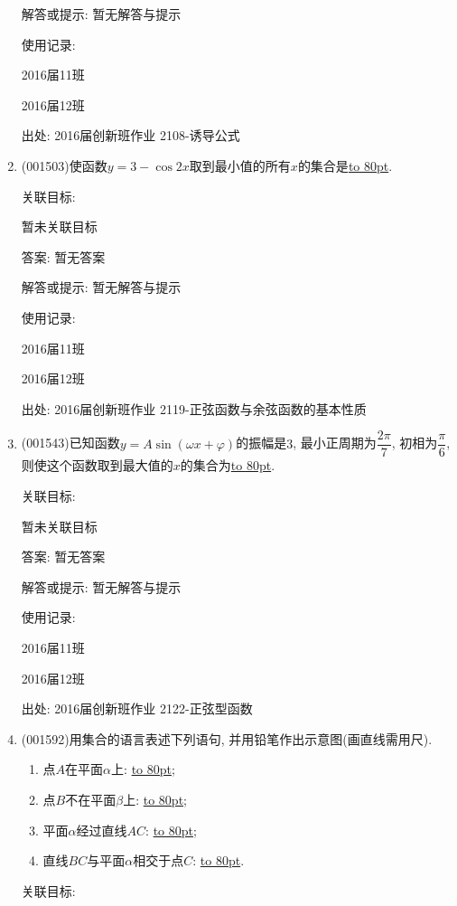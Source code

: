 \documentclass[10pt,a4paper]{article}
\newcommand{\blank}[1]{\underline{\hbox to #1pt{}}}
\begin{document}
\begin{enumerate}[1.]
解答或提示: 暂无解答与提示

使用记录:

2016届11班	

2016届12班	


出处: 2016届创新班作业	2108-诱导公式
\item { (001503)}使函数$y=3-\cos 2x$取到最小值的所有$x$的集合是\blank{80}.


关联目标:

暂未关联目标

答案: 暂无答案

解答或提示: 暂无解答与提示

使用记录:

2016届11班	

2016届12班	


出处: 2016届创新班作业	2119-正弦函数与余弦函数的基本性质
\item { (001543)}已知函数$y=A\sin(\omega x+\varphi)$的振幅是$3$, 最小正周期为$\dfrac{2\pi}{7}$,
初相为$\dfrac{\pi}{6}$, 则使这个函数取到最大值的$x$的集合为\blank{80}.


关联目标:

暂未关联目标

答案: 暂无答案

解答或提示: 暂无解答与提示

使用记录:

2016届11班	

2016届12班	


出处: 2016届创新班作业	2122-正弦型函数
\item { (001592)}用集合的语言表述下列语句, 并用铅笔作出示意图(画直线需用尺).
\begin{enumerate}[(1)]
\item 点$A$在平面$\alpha$上: \blank{80};\\ 
\item 点$B$不在平面$\beta$上: \blank{80};\\ 
\item 平面$\alpha$经过直线$AC$: \blank{80};\\ 
\item 直线$BC$与平面$\alpha$相交于点$C$: \blank{80}.\\ 
\end{enumerate}


关联目标:


\end{enumerate}
\end{document}

